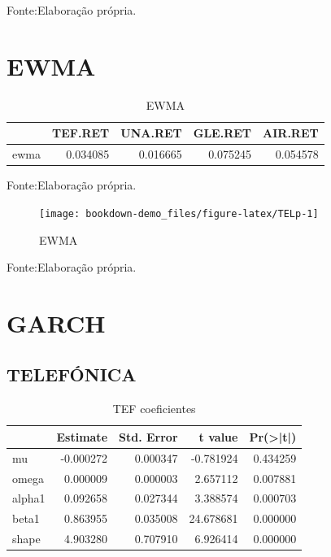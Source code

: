 \documentclass[
  12pt,
  a4paper,
  openany]{book}
\begin{document}
Fonte:Elaboração própria.

\justifying
\bigskip

\hypertarget{ewma}{%
\section{EWMA}\label{ewma}}

\begin{table}[!h]

\caption{\label{tab:unnamed-chunk-11}EWMA}
\centering
\begin{tabular}[t]{lrrrr}
\toprule
  & TEF.RET & UNA.RET & GLE.RET & AIR.RET\\
\midrule
ewma & 0.034085 & 0.016665 & 0.075245 & 0.054578\\
\bottomrule
\end{tabular}
\end{table}
\FloatBarrier
\centering

Fonte:Elaboração própria.

\justifying
\bigskip

\begin{figure}

{\centering \texttt{[image: bookdown-demo\_files/figure-latex/TELp-1]} 

}

\caption{EWMA}\label{fig:TELp}
\end{figure}
\FloatBarrier
\centering

Fonte:Elaboração própria.

\justifying
\bigskip

\hypertarget{garch}{%
\section{GARCH}\label{garch}}

\hypertarget{telefuxf3nica}{%
\subsection{TELEFÓNICA}\label{telefuxf3nica}}

\begin{table}[!h]

\caption{\label{tab:unnamed-chunk-12}TEF coeficientes}
\centering
\begin{tabular}[t]{lrrrr}
\toprule
  &  Estimate &  Std. Error &  t value & Pr(>|t|)\\
\midrule
mu & -0.000272 & 0.000347 & -0.781924 & 0.434259\\
omega & 0.000009 & 0.000003 & 2.657112 & 0.007881\\
alpha1 & 0.092658 & 0.027344 & 3.388574 & 0.000703\\
beta1 & 0.863955 & 0.035008 & 24.678681 & 0.000000\\
shape & 4.903280 & 0.707910 & 6.926414 & 0.000000\\
\bottomrule
\end{tabular}
\end{table}
\FloatBarrier
\centering
\end{document}
